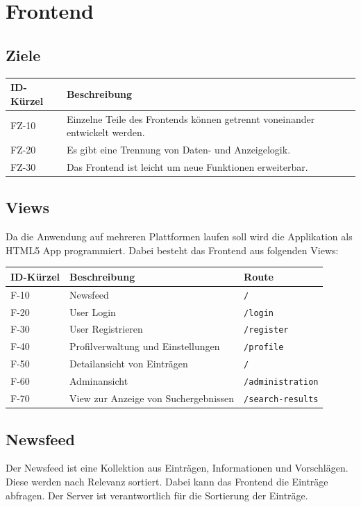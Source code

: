 \chapter{Frontend}

\section{Ziele}
\begin{tabularx}{\textwidth}{|l|X|}
    \toprule
    \textbf{ID-Kürzel} & \textbf{Beschreibung} \\
    \midrule
    \endhead
    \hline
    \caption{Ziele der Frontend-Architektur}
    \endfoot
    FZ-10 & Einzelne Teile des Frontends können getrennt voneinander entwickelt werden.\\
    FZ-20 & Es gibt eine Trennung von Daten- und Anzeigelogik.\\
    FZ-30 & Das Frontend ist leicht um neue Funktionen erweiterbar.\\
\end{tabularx}

\section{Views}
Da die Anwendung auf mehreren Plattformen laufen soll wird die Applikation als HTML5 App programmiert.
Dabei besteht das Frontend aus folgenden Views:
\begin{tabularx}{\textwidth}{|l|X|l|}
    \toprule
    \textbf{ID-Kürzel} & \textbf{Beschreibung} & \textbf{Route}\\
    \midrule
    \endhead
    \hline
    \caption{Einsatzbereiche}
    \label{Einsatzbereiche:tabelle}
    \endfoot
    F-10 & Newsfeed & \verb+/+\\
    F-20 & User Login & \verb+/login+ \\
    F-30 & User Registrieren & \verb+/register+ \\
    F-40 & Profilverwaltung und Einstellungen & \verb+/profile+\\
    F-50 & Detailansicht von Einträgen & \verb+/+\\
    F-60 & Adminansicht & \verb+/administration+\\
    F-70 & View zur Anzeige von Suchergebnissen & \verb+/search-results+\\
\end{tabularx}

\section{Newsfeed}
Der Newsfeed ist eine Kollektion aus Einträgen, Informationen und Vorschlägen. Diese werden nach Relevanz sortiert.
Dabei kann das Frontend die Einträge abfragen. Der Server ist verantwortlich für die Sortierung der Einträge.

